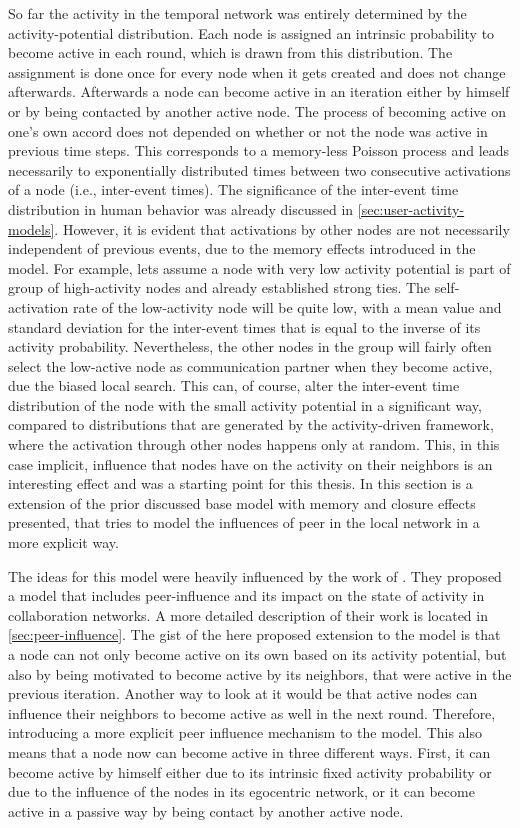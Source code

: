 So far the activity in the temporal network was entirely determined by the activity-potential distribution.
Each node is assigned an intrinsic probability to become active in each round, which is drawn from this distribution.
The assignment is done once for every node when it gets created and does not change afterwards.
Afterwards a node can become active in an iteration either by himself or by being contacted by another active node.
The process of becoming active on one's own accord does not depended on whether or not the node was active in previous time steps.
This corresponds to a memory-less Poisson process and leads necessarily to exponentially distributed times between two consecutive activations of a node (i.e., inter-event times).
The significance of the inter-event time distribution in human behavior was already discussed in \autoref{sec:user-activity-models}.
However, it is evident that activations by other nodes are not necessarily independent of previous events, due to the memory effects introduced in the model.
For example, lets assume a node with very low activity potential is part of group of high-activity nodes and already established strong ties.
The self-activation rate of the low-activity node will be quite low, with a mean value and standard deviation for the inter-event times that is equal to the inverse of its activity probability.
Nevertheless, the other nodes in the group will fairly often select the low-active node as communication partner when they become active, due the biased local search.
This can, of course, alter the inter-event time distribution of the node with the small activity potential in a significant way, compared to distributions that are generated by the activity-driven framework, where the activation through other nodes happens only at random.
This, in this case implicit, influence that nodes have on the activity on their neighbors is an interesting effect and was a starting point for this thesis.
In this section is a extension of the prior discussed base model with memory and closure effects presented, that tries to model the influences of peer in the local network in a more explicit way.

The ideas for this model were heavily influenced by the work of \citet{Walk2016}.
They proposed a model that includes peer-influence and its impact on the state of activity in collaboration networks.
A more detailed description of their work is located in \autoref{sec:peer-influence}.
The gist of the here proposed extension to the model is that a node can not only become active on its own based on its activity potential, but also by being motivated to become active by its neighbors, that were active in the previous iteration.
Another way to look at it would be that active nodes can influence their neighbors to become active as well in the next round.
Therefore, introducing a more explicit peer influence mechanism to the model.
This also means that a node now can become active in three different ways.
First, it can become active by himself either due to its intrinsic fixed activity probability or due to the influence of the nodes in its egocentric network, or it can become active in a passive way by being contact by another active node.

